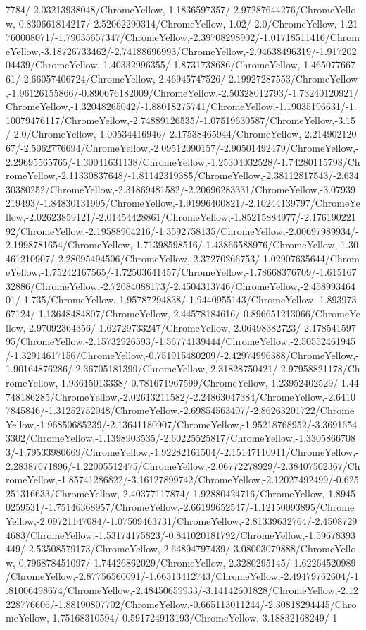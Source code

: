{\begin{tikzternal}
7784/-2.03213938048/ChromeYellow,-1.1836597357/-2.97287644276/ChromeYellow,-0.830661814217/-2.52062290314/ChromeYellow,-1.02/-2.0/ChromeYellow,-1.21760008071/-1.79035657347/ChromeYellow,-2.39708298902/-1.01718511416/ChromeYellow,-3.18726733462/-2.74188696993/ChromeYellow,-2.94638496319/-1.91720204439/ChromeYellow,-1.40332996355/-1.8731738686/ChromeYellow,-1.46507766761/-2.66057406724/ChromeYellow,-2.46945747526/-2.19927287553/ChromeYellow,-1.96126155866/-0.890676182009/ChromeYellow,-2.50328012793/-1.73240120921/ChromeYellow,-1.32048265042/-1.88018275741/ChromeYellow,-1.19035196631/-1.10079476117/ChromeYellow,-2.74889126535/-1.07519630587/ChromeYellow,-3.15/-2.0/ChromeYellow,-1.00534416946/-2.17538465944/ChromeYellow,-2.21490212067/-2.5062776694/ChromeYellow,-2.09512090157/-2.90501492479/ChromeYellow,-2.29695565765/-1.30041631138/ChromeYellow,-1.25304032528/-1.74280115798/ChromeYellow,-2.11330837648/-1.81142319385/ChromeYellow,-2.38112817543/-2.63430380252/ChromeYellow,-2.31869481582/-2.20696283331/ChromeYellow,-3.07939219493/-1.84830131995/ChromeYellow,-1.91996400821/-2.10244139797/ChromeYellow,-2.02623859121/-2.01454428861/ChromeYellow,-1.85215884977/-2.17619022192/ChromeYellow,-2.19588904216/-1.3592758135/ChromeYellow,-2.00697989934/-2.1998781654/ChromeYellow,-1.71398598516/-1.43866588976/ChromeYellow,-1.30461210907/-2.28095494506/ChromeYellow,-2.37270266753/-1.02907635644/ChromeYellow,-1.75242167565/-1.72503641457/ChromeYellow,-1.78668376709/-1.61516732886/ChromeYellow,-2.72084088173/-2.4504313746/ChromeYellow,-2.45899346401/-1.735/ChromeYellow,-1.95787294838/-1.9440955143/ChromeYellow,-1.89397367124/-1.13648484807/ChromeYellow,-2.44578184616/-0.896651213066/ChromeYellow,-2.97092364356/-1.62729733247/ChromeYellow,-2.06498382723/-2.17854159795/ChromeYellow,-2.15732926593/-1.56774139444/ChromeYellow,-2.50552461945/-1.32914617156/ChromeYellow,-0.751915480209/-2.42974996388/ChromeYellow,-1.90164876286/-2.36705181399/ChromeYellow,-2.31828750421/-2.97958821178/ChromeYellow,-1.93615013338/-0.781671967599/ChromeYellow,-1.23952402529/-1.44748186285/ChromeYellow,-2.02613211582/-2.24863047384/ChromeYellow,-2.64107845846/-1.31252752048/ChromeYellow,-2.69854563407/-2.86263201722/ChromeYellow,-1.96850685239/-2.13641180907/ChromeYellow,-1.95218768952/-3.36916543302/ChromeYellow,-1.1398903535/-2.60225525817/ChromeYellow,-1.33058667083/-1.79533980669/ChromeYellow,-1.92282161504/-2.15147110911/ChromeYellow,-2.28387671896/-1.22005512475/ChromeYellow,-2.06772278929/-2.38407502367/ChromeYellow,-1.85741286822/-3.16127899742/ChromeYellow,-2.12027492499/-0.625251316633/ChromeYellow,-2.40377117874/-1.92880424716/ChromeYellow,-1.89450259531/-1.75146368957/ChromeYellow,-2.66199652547/-1.12150093895/ChromeYellow,-2.09721147084/-1.07509463731/ChromeYellow,-2.81339632764/-2.45087294683/ChromeYellow,-1.53174175823/-0.841020181792/ChromeYellow,-1.59678393449/-2.53508579173/ChromeYellow,-2.64894797439/-3.08003079888/ChromeYellow,-0.796878451097/-1.74426862029/ChromeYellow,-2.3280295145/-1.62264520989/ChromeYellow,-2.87756560091/-1.66313412743/ChromeYellow,-2.49479762604/-1.81006498674/ChromeYellow,-2.48450659933/-3.14142601828/ChromeYellow,-2.12228776606/-1.88190807702/ChromeYellow,-0.665113011244/-2.30818294445/ChromeYellow,-1.75168310594/-0.591724913193/ChromeYellow,-3.18832168249/-1
\end{tikzternal}}
